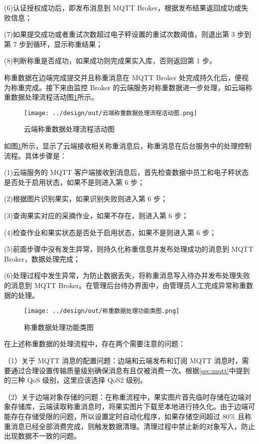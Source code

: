 (6)认证授权成功后，即发布消息到 MQTT Broker，根据发布结果返回成功或失败信息；

(7)如果提交成功或者重试次数超过电子秤设置的重试次数阈值，则退出第 3 步到第 7 步到循环，显示称重结果；

(8)判断称重是否成功，如果成功则完成果实入库，否则返回第 1 步。

称重数据在边端完成提交并且称重消息在 MQTT Broker 处完成持久化后，便视为称重完成。接下来由监控 Broker 的云端服务对称重数据进一步处理，如云端称重数据处理流程活动图\ref{fig:云端称重数据处理流程活动图}所示。

\begin{figure}
    \centering
    \texttt{[image: ../design/out/云端称重数据处理流程活动图.png]}
    \caption{云端称重数据处理流程活动图}
    \label{fig:云端称重数据处理流程活动图}
\end{figure}

如图\ref{fig:云端称重数据处理流程活动图}所示，显示了云端接收相关称重消息后，称重消息在后台服务中的处理控制流程。具体步骤是：

(1)云端服务的 MQTT 客户端接收到消息后，首先检查数据中员工和电子秤状态是否处于启用状态，如果不是则进入第 6 步；

(2)根据图片识别果实，如果识别失败则进入第 6 步；

(3)查询果实对应的采摘作业，如果不存在，则进入第 6 步；

(4)检查作业和果实状态是否处于启用状态，如果不是则进入第 6 步；

(5)前面步骤中没有发生异常，则持久化称重信息并发布处理成功的消息到 MQTT Broker，数据处理完成；

(6)处理过程中发生异常，为防止数据丢失，将称重消息写入待办并发布处理失败的消息到 MQTT Broker。在管理后台待办界面中，由管理员人工完成异常称重数据的处理。

\begin{figure}
    \centering
    \texttt{[image: ../design/out/称重数据处理功能类图.png]}
    \caption{称重数据处理功能类图}
    \label{fig:称重数据处理功能类图}
\end{figure}

在上述称重数据的处理流程中，存在两个需要注意的问题：

（1）关于 MQTT 消息的配置问题：边端和云端发布和订阅 MQTT 消息时，需要通过合理设置传输质量级别确保消息有且仅被消费一次。根据\ref{sec:mqtt}中提到的三种 QoS 级别，这里应该选择 QoS2 级别。

（2）关于边端对象存储的问题：在称重流程中，果实图片首先临时存储在边端对象存储库，云端读取称重消息时，将果实图片下载至本地进行持久化。由于边端可能存在存储受限的问题，所以设置定时自动化程序，如果存储空间超过 80\% 且称重消息已经全部消费完成，则触发数据清理。清理过程中禁止新的对象写入，防止出现数据不一致的问题。

